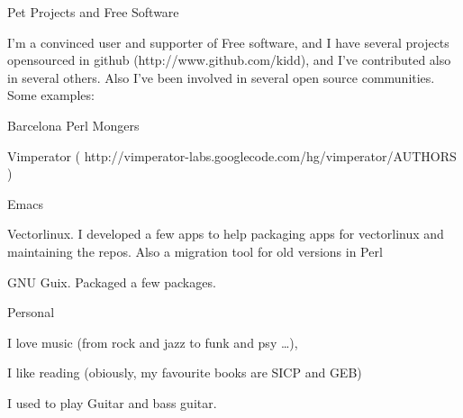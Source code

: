 \documentclass{resume} %
\begin{document}
\begin{rSection}{Pet Projects and Free Software}

  I'm a convinced user and supporter of Free software, and I have
  several projects opensourced in github (http://www.github.com/kidd),
  and I've contributed also in several others. Also I've been
  involved in several open source communities. Some examples:

\item Barcelona Perl Mongers
\item Vimperator ( http://vimperator-labs.googlecode.com/hg/vimperator/AUTHORS )
\item Emacs
\item Vectorlinux. I developed a few apps to help packaging apps for
  vectorlinux and maintaining the repos. Also a migration tool for old
  versions in Perl
\item GNU Guix. Packaged a few packages.

\end{rSection}

\begin{rSection}{Personal}

\item I love music (from rock and jazz to funk and psy \ldots),
\item I like reading (obiously, my favourite books are SICP and GEB)
\item I used to play Guitar and bass guitar.

\end{rSection}





\end{document}
